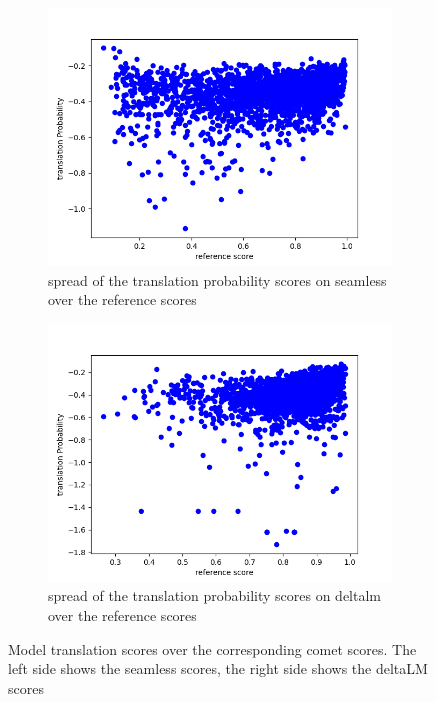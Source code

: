 \begin{figure}[ht]
    \centering%
    \begin{subfigure}{0.4\linewidth}
        \includegraphics[width=\textwidth]{Latex/sections/images/seamlessgenprob.png}
        \caption{spread of the translation probability scores on seamless over the reference scores}
    \end{subfigure}
    \begin{subfigure}{0.4\linewidth}
        \includegraphics[width=\textwidth]{Latex/sections/images/dlmgenprob.png}
        \caption{spread of the translation probability scores on deltalm over the reference scores}
    \end{subfigure}
   \caption{Model translation scores over the corresponding comet scores. The left side shows the seamless scores, the right side shows the deltaLM scores}
    \label{fig:translationeval scatter plot translation}
    \end{figure}

